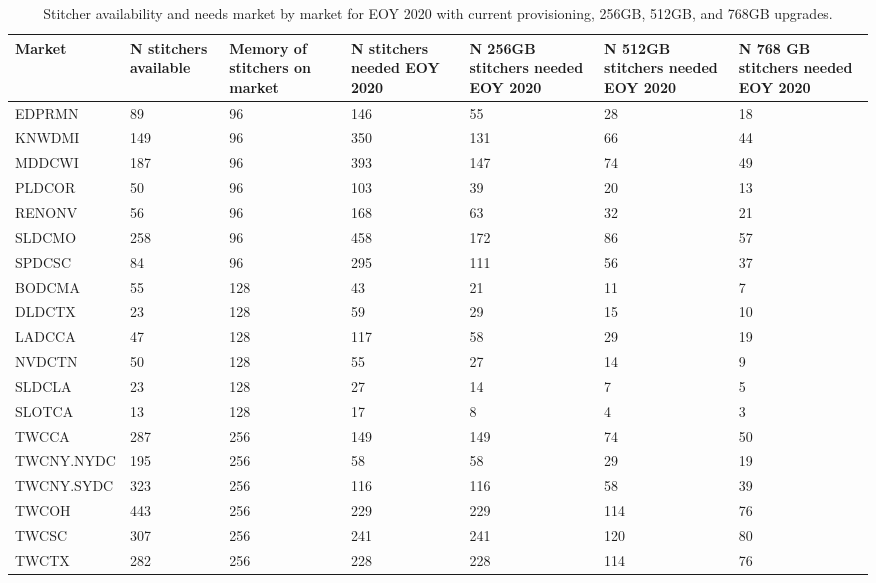 \documentclass{article}
\begin{document}
\begin{table}
\begin{tabular}{|l|p{16mm}|p{16mm}|p{16mm}|p{16mm}|p{16mm}|p{16mm}|} 
\hline Market & N stitchers available & Memory of stitchers on market & N stitchers needed EOY 2020 & N 256GB stitchers needed EOY 2020 & N 512GB stitchers needed EOY 2020 & N 768 GB stitchers needed EOY 2020 \\
\hline EDPRMN & 89 & 96 & 146 & 55 & 28 & 18 \\
\hline KNWDMI & 149 & 96 & 350 & 131 & 66 & 44 \\
\hline MDDCWI & 187 & 96 & 393 & 147 & 74 & 49 \\
\hline PLDCOR & 50 & 96 & 103 & 39 & 20 & 13 \\
\hline RENONV & 56 & 96 & 168 & 63 & 32 & 21 \\
\hline SLDCMO & 258 & 96 & 458 & 172 & 86 & 57 \\
\hline SPDCSC & 84 & 96 & 295 & 111 & 56 & 37 \\
\hline BODCMA & 55 & 128 & 43 & 21 & 11 & 7 \\
\hline DLDCTX & 23 & 128 & 59 & 29 & 15 & 10 \\
\hline LADCCA & 47 & 128 & 117 & 58 & 29 & 19 \\
\hline NVDCTN & 50 & 128 & 55 & 27 & 14 & 9 \\
\hline SLDCLA & 23 & 128 & 27 & 14 & 7 & 5 \\
\hline SLOTCA & 13 & 128 & 17 & 8 & 4 & 3 \\
\hline TWCCA & 287 & 256 & 149 & 149 & 74 & 50 \\
\hline TWCNY.NYDC & 195 & 256 & 58 & 58 & 29 & 19 \\
\hline TWCNY.SYDC & 323 & 256 & 116 & 116 & 58 & 39 \\
\hline TWCOH & 443 & 256 & 229 & 229 & 114 & 76 \\
\hline TWCSC & 307 & 256 & 241 & 241 & 120 & 80 \\
\hline TWCTX & 282 & 256 & 228 & 228 & 114 & 76 \\
\hline 
\end{tabular}
\caption{\label{TABLE-StitchersNeeded2020}Stitcher availability and needs market by market for EOY 2020 with current provisioning, 256GB, 512GB, and 768GB upgrades.} 
\end{table}
\end{document}
